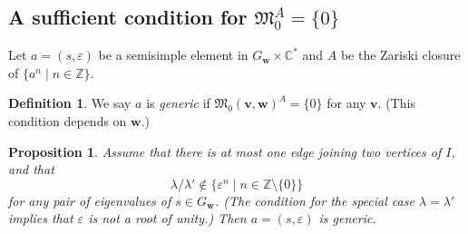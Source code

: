 \documentclass[12pt]{amsart}
\def\Bbb{\mathbb}
\def\frak{\mathfrak}
\newcommand{\rom}{\textup}
\newtheorem{Proposition}[equation]{Proposition}
\theoremstyle{definition}
\newtheorem{Definition}[equation]{Definition}
\theoremstyle{remark}
\numberwithin{equation}{subsection}
\newcommand{\C}{{\Bbb C}}
\newcommand{\ve}{\varepsilon}
\newcommand{\M}{{\frak M}} %
\newcommand{\Mreg}{{\frak M_0^{\operatorname{reg}}}}
\newcommand{\bv}{{\mathbf v}} %
\newcommand{\bw}{{\mathbf w}} %
\begin{document}


\subsection{A sufficient condition for $\M_0^A = \{ 0\}$}
Let $a = (s,\varepsilon)$ be a semisimple element in
$G_\bw\times\C^*$ and $A$ be the Zariski closure of
$\{ a^n \mid n\in\mathbb Z\}$.

\begin{Definition}\label{def:generic}
We say $a$ is {\it generic\/} if
$\M_0(\bv,\bw)^A = \{ 0\}$ for any $\bv$.
(This condition depends on $\bw$.)
\end{Definition}

\begin{Proposition}
Assume that there is at most one edge joining two vertices of $I$, and
%
that
\begin{equation*}
   \lambda/\lambda' \notin \{ \ve^n \mid n\in\mathbb Z\setminus\{0\}\}
\end{equation*}
for any pair of eigenvalues of $s\in G_\bw$.
\rom(The condition for the special case $\lambda = \lambda'$ implies
that $\ve$ is not a root of unity.\rom)
Then $a = (s,\ve)$ is generic.
\end{Proposition}
\end{document}
